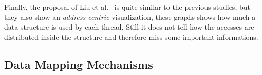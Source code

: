 Finally, the proposal of Liu et al.~\cite{Liu14Tool} is quite similar to the previous studies, but
they also show an \emph{address centric} visualization, these graphs shows how
much a data structure is used by each thread. Still it does not tell how the
accesses are distributed inside the structure and therefore miss some
important informations.


\subsection{Data Mapping Mechanisms}
\label{sec:soa-mapping}

%
%    

